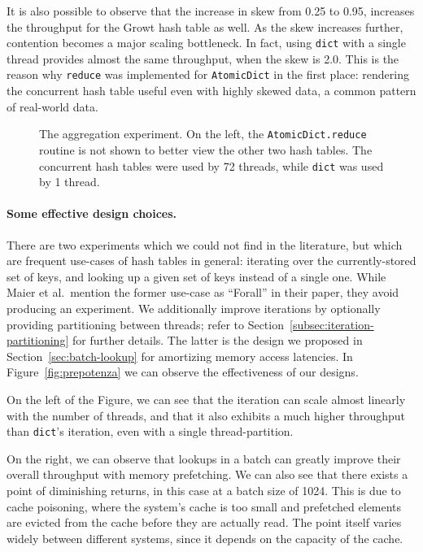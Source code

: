 It is also possible to observe that the increase in skew from 0.25 to 0.95, increases the throughput for the Growt hash table as well.
As the skew increases further, contention becomes a major scaling bottleneck.
In fact, using \texttt{dict} with a single thread provides almost the same throughput, when the skew is 2.0.
This is the reason why \texttt{reduce} was implemented for \texttt{AtomicDict} in the first place: rendering the concurrent hash table useful even with highly skewed data, a common pattern of real-world data.

\begin{figure}
    \begin{centering}
        \scalebox{0.4}{}%
        \scalebox{0.4}{}
        \caption{The aggregation experiment. On the left, the \texttt{AtomicDict.reduce} routine is not shown to better view the other two hash tables. The concurrent hash tables were used by 72 threads, while \texttt{dict} was used by 1 thread.}
        \label{fig:aggregation}
    \end{centering}
\end{figure}

\paragraph{Some effective design choices.}
There are two experiments which we could not find in the literature, but which are frequent use-cases of hash tables in general: iterating over the currently-stored set of keys, and looking up a given set of keys instead of a single one.
While Maier et al.\ mention the former use-case as ``Forall'' in their paper, they avoid producing an experiment.
We additionally improve iterations by optionally providing partitioning between threads; refer to Section~\ref{subsec:iteration-partitioning} for further details.
The latter is the design we proposed in Section~\ref{sec:batch-lookup} for amortizing memory access latencies.
In Figure~\ref{fig:prepotenza} we can observe the effectiveness of our designs.

On the left of the Figure, we can see that the iteration can scale almost linearly with the number of threads, and that it also exhibits a much higher throughput than \texttt{dict}'s iteration, even with a single thread-partition.

On the right, we can observe that lookups in a batch can greatly improve their overall throughput with memory prefetching.
We can also see that there exists a point of diminishing returns, in this case at a batch size of 1024.
This is due to cache poisoning, where the system's cache is too small and prefetched elements are evicted from the cache before they are actually read.
The point itself varies widely between different systems, since it depends on the capacity of the cache.

